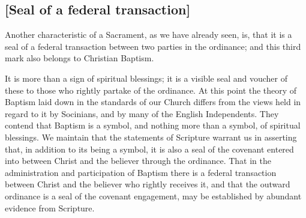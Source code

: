 \documentclass[
  english,
]{book}
\begin{document}
\hypertarget{seal-of-a-federal-transaction}{%
\subsection{{[}Seal of a federal transaction{]}}\label{seal-of-a-federal-transaction}}

Another characteristic of a Sacrament, as we have already seen, is, that it is a seal of a federal transaction between two parties in the ordinance; and this third mark also belongs to Christian Baptism.

It is more than a sign of spiritual blessings; it is a visible seal and voucher of these to those who rightly partake of the ordinance. At this point the theory of Baptism laid down in the standards of our Church differs from the views held in regard to it by Socinians, and by many of the English Independents. They contend that Baptism is a symbol, and nothing more than a symbol, of spiritual blessings. We maintain that the statements of Scripture warrant us in asserting that, in addition to its being a symbol, it is also a seal of the covenant entered into between Christ and the believer through the ordinance. That in the administration and participation of Baptism there is a federal transaction between Christ and the believer who rightly receives it, and that the outward ordinance is a seal of the covenant engagement, may be established by abundant evidence from Scripture.
\end{document}
